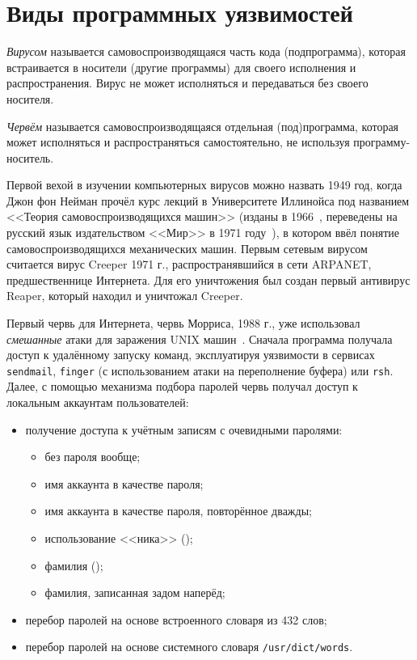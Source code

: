 



\section{Виды программных уязвимостей}

\emph{Вирусом} называется самовоспроизводящаяся часть кода (подпрограмма), которая встраивается в носители (другие программы) для своего исполнения и распространения. Вирус не может исполняться и передаваться без своего носителя.

\emph{Червём} называется самовоспроизводящаяся отдельная (под)программа, которая может исполняться и распространяться самостоятельно, не используя программу-носитель.

Первой вехой в изучении компьютерных вирусов можно назвать 1949 год, когда Джон фон Нейман прочёл курс лекций в Университете Иллинойса под названием <<Теория самовоспроизводящихся машин>> (изданы в 1966~\cite{Neumann:1966}, переведены на русский язык издательством <<Мир>> в 1971 году~\cite{Neumann:1971}), в котором ввёл понятие самовоспроизводящихся механических машин. Первым сетевым вирусом считается вирус Creeper 1971 г., распространявшийся в сети ARPANET, предшественнице Интернета. Для его уничтожения был создан первый антивирус Reaper, который находил и уничтожал Creeper.

Первый червь для Интернета, червь Морриса, 1988 г., уже использовал \emph{смешанные} атаки для заражения UNIX машин~\cite{EichinRochlis:1988, Spafford:1989}. Сначала программа получала доступ к удалённому запуску команд, эксплуатируя уязвимости в сервисах \texttt{sendmail}, \texttt{finger} (с использованием атаки на переполнение буфера) или \texttt{rsh}. Далее, с помощью механизма подбора паролей червь получал доступ к локальным аккаунтам пользователей:
\begin{itemize}
    \item получение доступа к учётным записям с очевидными паролями:
		\begin{itemize}
			\item без пароля вообще;
			\item имя аккаунта в качестве пароля;
			\item имя аккаунта в качестве пароля, повторённое дважды;
			\item использование <<ника>> ();
			\item фамилия ();
			\item фамилия, записанная задом наперёд;
		\end{itemize}
		\item перебор паролей на основе встроенного словаря из 432 слов;
		\item перебор паролей на основе системного словаря \texttt{/usr/dict/words}.
\end{itemize}


